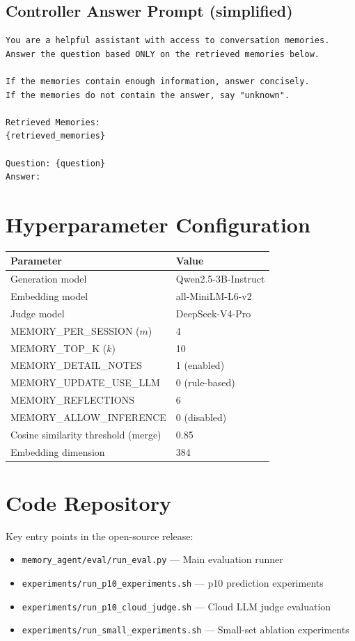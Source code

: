 \documentclass[11pt]{article}
\begin{document}
\subsection{Controller Answer Prompt (simplified)}
{\footnotesize
\begin{verbatim}
You are a helpful assistant with access to conversation memories.
Answer the question based ONLY on the retrieved memories below.

If the memories contain enough information, answer concisely.
If the memories do not contain the answer, say "unknown".

Retrieved Memories:
{retrieved_memories}

Question: {question}
Answer:
\end{verbatim}
}

\section{Hyperparameter Configuration}

\begin{center}
\begin{tabular}{ll}
\toprule
\textbf{Parameter} & \textbf{Value} \\
\midrule
Generation model & Qwen2.5-3B-Instruct \\
Embedding model & all-MiniLM-L6-v2 \\
Judge model & DeepSeek-V4-Pro \\
MEMORY\_PER\_SESSION ($m$) & 4 \\
MEMORY\_TOP\_K ($k$) & 10 \\
MEMORY\_DETAIL\_NOTES & 1 (enabled) \\
MEMORY\_UPDATE\_USE\_LLM & 0 (rule-based) \\
MEMORY\_REFLECTIONS & 6 \\
MEMORY\_ALLOW\_INFERENCE & 0 (disabled) \\
Cosine similarity threshold (merge) & 0.85 \\
Embedding dimension & 384 \\
\bottomrule
\end{tabular}
\end{center}

\section{Code Repository}

Key entry points in the open-source release:
\begin{itemize}
    \item \texttt{memory\_agent/eval/run\_eval.py} --- Main evaluation runner
    \item \texttt{experiments/run\_p10\_experiments.sh} --- p10 prediction experiments
    \item \texttt{experiments/run\_p10\_cloud\_judge.sh} --- Cloud LLM judge evaluation
    \item \texttt{experiments/run\_small\_experiments.sh} --- Small-set ablation experiments
\end{itemize}
\end{document}
